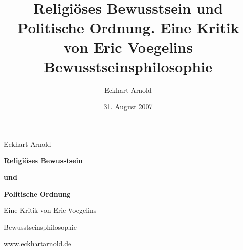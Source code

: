 \documentclass[11pt,a4paper]{book}
\begin{document}
\title{Religiöses Bewusstsein und Politische Ordnung. Eine Kritik von Eric
  Voegelins Bewusstseinsphilosophie}

\author{Eckhart Arnold}

\date{31. August 2007}


\begin{titlepage}

\setlength{\parindent}{0em}
\begin{flushleft}

{\Large Eckhart Arnold}

\setlength{\parskip}{2cm}
{\huge\bf Religiöses Bewusstsein}

\setlength{\parskip}{0.5cm}
{\huge\bf und}

\setlength{\parskip}{0.5cm}
{\huge\bf Politische Ordnung}

\setlength{\parskip}{1.0cm}
{\huge Eine Kritik von Eric Voegelins}

\setlength{\parskip}{0.5cm}
{\huge Bewusstseinsphilosophie}

\end{flushleft}

\begin{center}

\setlength{\parskip}{11cm}
{\footnotesize www.eckhartarnold.de}
\end{center}

\end{titlepage}


\newpage

 \tableofcontents

\newpage


\setcounter{page}{1}











\end{document}
